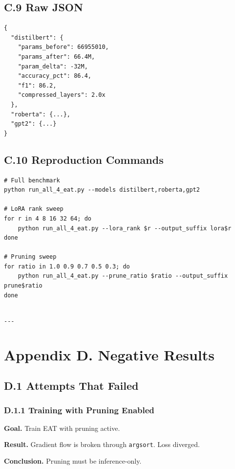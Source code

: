 \subsection{C.9 Raw JSON}

\begin{lstlisting}
{
  "distilbert": {
    "params_before": 66955010,
    "params_after": 66.4M,
    "param_delta": -32M,
    "accuracy_pct": 86.4,
    "f1": 86.2,
    "compressed_layers": 2.0x
  },
  "roberta": {...},
  "gpt2": {...}
}
\end{lstlisting}

\subsection{C.10 Reproduction Commands}

\begin{lstlisting}
# Full benchmark
python run_all_4_eat.py --models distilbert,roberta,gpt2

# LoRA rank sweep
for r in 4 8 16 32 64; do
    python run_all_4_eat.py --lora_rank $r --output_suffix lora$r
done

# Pruning sweep
for ratio in 1.0 0.9 0.7 0.5 0.3; do
    python run_all_4_eat.py --prune_ratio $ratio --output_suffix prune$ratio
done
\end{lstlisting}
\begin{lstlisting}

---
\end{lstlisting}


\section{Appendix D. Negative Results}

\subsection{D.1 Attempts That Failed}

\subsubsection{D.1.1 Training with Pruning Enabled}

\textbf{Goal.} Train EAT with pruning active.

\textbf{Result.} Gradient flow is broken through \texttt{argsort}. Loss diverged.

\textbf{Conclusion.} Pruning must be inference-only.

